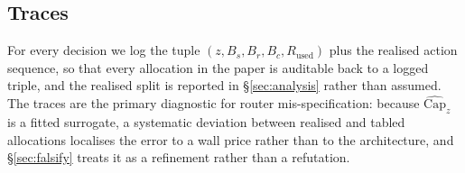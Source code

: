 \documentclass[10pt]{article}
\theoremstyle{definition}
\theoremstyle{plain}
\renewcommand{\Cap}{\mathrm{Cap}}
\begin{document}
\subsection{Traces}
For every decision we log the tuple $(z,B_s,B_r,B_c,R_{\mathrm{used}})$ plus the realised action sequence, so that every allocation in the paper is auditable back to a logged triple, and the realised split is reported in \S\ref{sec:analysis} rather than assumed. The traces are the primary diagnostic for router mis-specification: because $\widehat{\Cap}_z$ is a fitted surrogate, a systematic deviation between realised and tabled allocations localises the error to a wall price rather than to the architecture, and \S\ref{sec:falsify} treats it as a refinement rather than a refutation.

\end{document}
